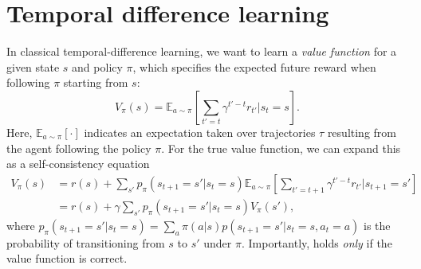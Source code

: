 \section{Temporal difference learning}
\label{sec:temporal_difference}

In classical temporal-difference learning, we want to learn a \emph{value function} for a given state $s$ and policy $\pi$, which specifies the expected future reward when following $\pi$ starting from $s$:
\begin{equation}
    \label{eq:V-values}
    V_{\pi}(s) = \mathbb{E}_{a \sim \pi} \left [ \sum_{t' = t} \gamma^{t' - t} r_{t'} | s_t = s \right ].
\end{equation}
Here, $\mathbb{E}_{a \sim \pi} [ \cdot ]$ indicates an expectation taken over trajectories $\tau$ resulting from the agent following the policy $\pi$.
For the true value function, we can expand this as a self-consistency equation
\begin{align}
    \label{eq:value_expansion}
    V_{\pi}(s) &= r(s) + \sum_{s'} p_{\pi}(s_{t+1} = s' | s_t = s) \mathbb{E}_{a \sim \pi} \left [ \sum_{t' = t+1} \gamma^{t' - t} r_{t'} | s_{t+1} = s' \right ] \\
    &=  r(s) + \gamma \sum_{s'} p_{\pi}(s_{t+1} = s' | s_t = s) V_{\pi}(s'),
\end{align}
where $p_{\pi}(s_{t+1} = s' | s_t = s) = \sum_a \pi(a|s) p(s_{t+1} = s' | s_t = s, a_t = a)$ is the probability of transitioning from $s$ to $s'$ under $\pi$.
Importantly,  holds \emph{only} if the value function is correct.

